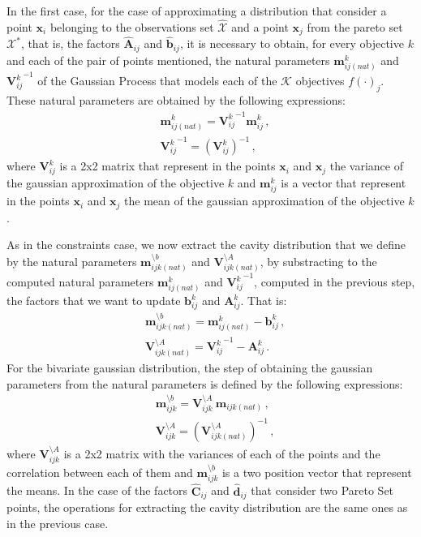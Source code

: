 In the first case, for the case of approximating a distribution that consider a point $\boldsymbol{x}_i$ belonging to the observations set $\hat{\mathcal{X}}$ and a point $\boldsymbol{x}_j$ from the pareto set $\mathcal{X}^*$, that is, the factors $\hat{\boldsymbol{A}}_{ij}$ and $\hat{\boldsymbol{b}}_{ij}$, it is necessary to obtain, for every objective $k$ and each of the pair of points mentioned, the natural parameters $\boldsymbol{m}_{ij(nat)}^{k}$ and ${\boldsymbol{V}_{ij}^{k}}^{-1}$ of the Gaussian Process that models each of the $\mathcal{K}$ objectives $f(\cdot)_j$.
These natural parameters are obtained by the following expressions:
\begin{align}
   & \boldsymbol{m}_{ij(nat)}^{k} = {\boldsymbol{V}_{ij}^{k}}^{-1}\boldsymbol{m}_{ij}^{k}\,, \nonumber \\
   & {\boldsymbol{V}_{ij}^{k}}^{-1} = (\boldsymbol{V}_{ij}^{k})^{-1}\,,
\end{align}
where $\boldsymbol{V}_{ij}^{k}$ is a 2x2 matrix that represent in the points $\boldsymbol{x}_i$ and $\boldsymbol{x}_j$ the variance of the gaussian approximation of the objective $k$ and $\boldsymbol{m}_{ij}^{k}$ is a vector that represent in the points $\boldsymbol{x}_i$ and $\boldsymbol{x}_j$ the mean of the gaussian approximation of the objective $k$.

As in the constraints case, we now extract the cavity distribution that we define by the natural parameters $\boldsymbol{m}_{ijk(nat)}^{\setminus b}$ and $\boldsymbol{V}_{ijk(nat)}^{\setminus A}$, by substracting to the computed natural parameters $\boldsymbol{m}_{ij(nat)}^{k}$ and ${\boldsymbol{V}_{ij}^{k}}^{-1}$, computed in the previous step, the factors that we want to update $\boldsymbol{b}_{ij}^{k}$ and $\boldsymbol{A}_{ij}^{k}$. That is:
\begin{align}
    & \boldsymbol{m}_{ijk(nat)}^{\setminus b} = \boldsymbol{m}_{ij(nat)}^{k} - \boldsymbol{b}_{ij}^{k}\,, \nonumber \\
    & \boldsymbol{V}_{ijk(nat)}^{\setminus A} = {\boldsymbol{V}_{ij}^{k}}^{-1} - \boldsymbol{A}_{ij}^{k}\,.
\end{align}
For the bivariate gaussian distribution, the step of obtaining the gaussian parameters from the natural parameters is defined by the following expressions:
\begin{align}
    & \boldsymbol{m}_{ijk}^{\setminus b} = \boldsymbol{V}_{ijk}^{\setminus A}\ \boldsymbol{m}_{ijk(nat)}\,, \nonumber \\
    & \boldsymbol{V}_{ijk}^{\setminus A} = (\boldsymbol{V}_{ijk(nat)}^{\setminus A})^{-1}\,,
\end{align}
where $\boldsymbol{V}_{ijk}^{\setminus A}$ is a 2x2 matrix with the variances of each of the points and the correlation between each of them and $\boldsymbol{m}_{ijk}^{\setminus b}$ is a two position vector that represent the means. In the case of the factors $\hat{\boldsymbol{C}}_{ij}$ and $\hat{\boldsymbol{d}}_{ij}$ that consider two Pareto Set points, the operations for extracting the cavity distribution are the same ones as in the previous case.


